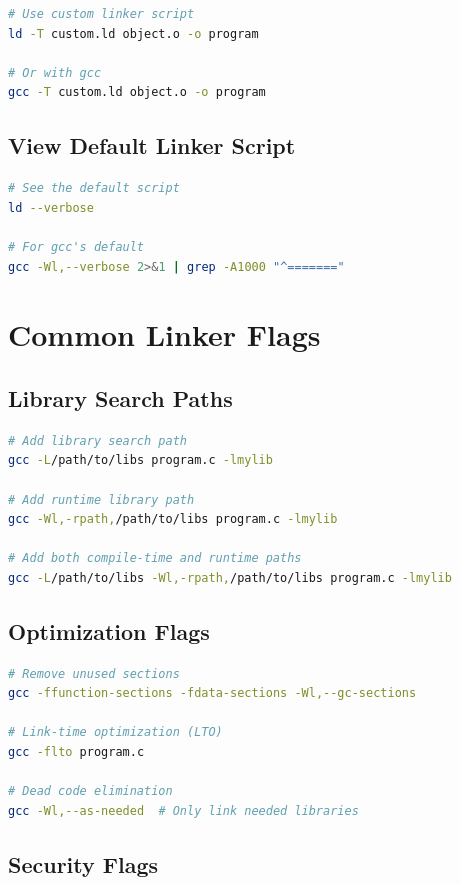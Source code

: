 \begin{lstlisting}[language=bash]
# Use custom linker script
ld -T custom.ld object.o -o program

# Or with gcc
gcc -T custom.ld object.o -o program
\end{lstlisting}

\subsection{View Default Linker Script}

\begin{lstlisting}[language=bash]
# See the default script
ld --verbose

# For gcc's default
gcc -Wl,--verbose 2>&1 | grep -A1000 "^======="
\end{lstlisting}

\section{Common Linker Flags}

\subsection{Library Search Paths}

\begin{lstlisting}[language=bash]
# Add library search path
gcc -L/path/to/libs program.c -lmylib

# Add runtime library path
gcc -Wl,-rpath,/path/to/libs program.c -lmylib

# Add both compile-time and runtime paths
gcc -L/path/to/libs -Wl,-rpath,/path/to/libs program.c -lmylib
\end{lstlisting}

\subsection{Optimization Flags}

\begin{lstlisting}[language=bash]
# Remove unused sections
gcc -ffunction-sections -fdata-sections -Wl,--gc-sections

# Link-time optimization (LTO)
gcc -flto program.c

# Dead code elimination
gcc -Wl,--as-needed  # Only link needed libraries
\end{lstlisting}

\subsection{Security Flags}

